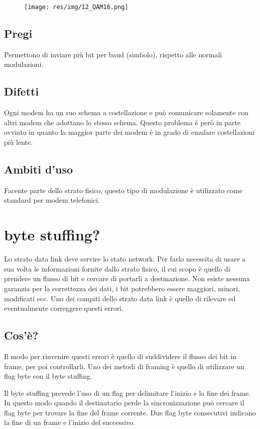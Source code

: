 \begin{figure}[H]
\centering
\texttt{[image: res/img/12\_QAM16.png]}
\end{figure}

\subsection{Pregi}
Permettono di inviare più bit per baud (simbolo), rispetto alle normali modulazioni. 
\subsection{Difetti}
Ogni modem ha un suo schema a costellazione e può comunicare solamente con altri modem che adottano lo stesso schema.
Questo problema è però in parte ovviato in quanto la maggior parte dei modem è in grado di emulare costellazioni più lente.
\subsection{Ambiti d'uso}
Facente parte dello strato fisico, questo tipo di modulazione è utilizzato come standard per modem telefonici.

\section{byte stuffing?}
Lo strato data link deve servire lo stato network. Per farlo necessita di usare a sua volta le informazioni fornite dallo strato fisico, il cui scopo è quello di prendere un flusso di bit e cercare di portarli a destinazione.
Non esiste nessuna garanzia per la correttezza dei dati, i bit potrebbero essere maggiori, minori, modificati ecc. Uno dei compiti dello strato data link è quello di rilevare ed eventualmente correggere questi errori.
\subsection{Cos'è?}
Il modo per rinvenire questi errori è quello di suddividere il flusso dei bit in frame, per poi controllarli. Uno dei metodi di framing è quello di utilizzare un flag byte con il byte stuffing.

Il byte stuffing prevede l'uso di un flag per delimitare l'inizio e la fine dei frame. In questo modo quando il destinatario perde la sincronizzazione può cercare il flag byte per trovare la fine del frame corrente. Due flag byte consecutivi indicano la fine di un frame e l'inizio del successivo.

